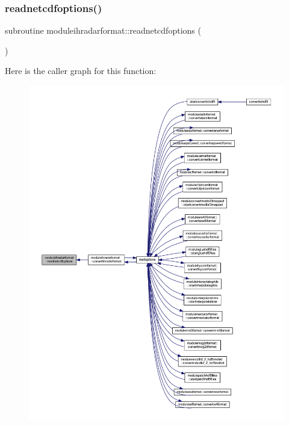 \subsubsection{\texorpdfstring{readnetcdfoptions()}{readnetcdfoptions()}}
{\footnotesize\ttfamily subroutine moduleihradarformat\+::readnetcdfoptions (\begin{DoxyParamCaption}{ }\end{DoxyParamCaption})\hspace{0.3cm}{\ttfamily [private]}}

Here is the caller graph for this function\+:\nopagebreak
\begin{figure}[H]
\begin{center}
\leavevmode
\includegraphics[width=350pt]{namespacemoduleihradarformat_a11ef1762e3ede5825ed4cfa4192378d3_icgraph}
\end{center}
\end{figure}
\mbox{\label{namespacemoduleihradarformat_aee7099f1405740714bd8905f16b2c9bf}} 

